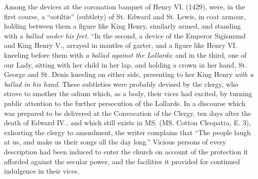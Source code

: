 Among the devices at the coronation banquet of Henry VI. (1429), were, in
the first course, a “sotiltie” (subtlety) of St. Edward and St. Lewis, in coat
armour, holding between them a figure like King Henry, similarly armed, and
standing with a \textit{ballad under his feet}. “In the second, a device of the Emperor
Sigismund and King Henry V., arrayed in mantles of garter, and a figure like
Henry VI. kneeling before them with \textit{a ballad against the Lollards}; %
and in the
third, one of our Lady, sitting with her child in her lap, and holding a crown in
her hand, St. George and St. Denis kneeling on either side, presenting to her
King Henry \textit{with a ballad in his hand}. %
These subtleties were probably devised
by the clergy, who strove to smother the odium which, as a body, their vices had
excited, by turning public attention to the further persecution of the Lollards. %
In a discourse which was prepared to be delivered at the Convocation of the
Clergy, ten days after the death of Edward IV., and which still exists in MS.
(MS. Cotton Cleopatra, E. 3), exhorting the clergy to amendment, the writer
complains that “The people laugh at us, and make us their songs all the day
long.” Vicious persons of every description had been induced to enter the church
on account of the protection it afforded against the secular power, and the facilities
it provided for continued indulgence in their vices.

